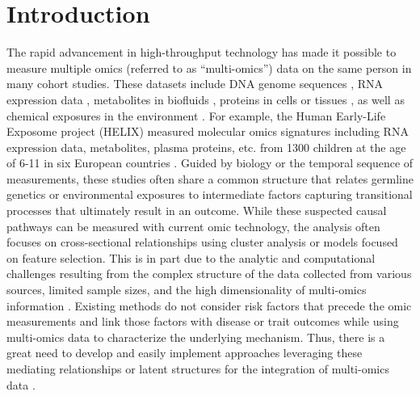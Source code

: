 \section{Introduction} \label{sec1}
The rapid advancement in high-throughput technology has made it possible to measure multiple omics (referred to as ``multi-omics'') data on the same person in many cohort studies. These datasets include DNA genome sequences \citep{goodwin2016coming}, RNA expression data \citep{ozsolak2011rna}, metabolites in biofluids \citep{beger2013review}, proteins in cells or tissues \citep{aslam2017proteomics}, as well as chemical exposures in the environment \citep{wild2005complementing}. For example, the Human Early-Life Exposome project (HELIX) measured molecular omics signatures including RNA expression data, metabolites, plasma proteins, etc. from 1300 children at the age of 6-11 in six European countries \citep{vrijheid2014human}. Guided by biology or the temporal sequence of measurements, these studies often share a common structure that relates germline genetics or environmental exposures to intermediate factors capturing transitional processes that ultimately result in an outcome. While these suspected causal pathways can be measured with current omic technology, the analysis often focuses on cross-sectional relationships using cluster analysis or models focused on feature selection. This is in part due to the analytic and computational challenges resulting from the complex structure of the data collected from various sources, limited sample sizes, and the high dimensionality of multi-omics information \citep{tini2019multi}. Existing methods do not consider risk factors that precede the omic measurements and link those factors with disease or trait outcomes while using multi-omics data to characterize the underlying mechanism. Thus, there is a great need to develop and easily implement approaches leveraging these mediating relationships or latent structures for the integration of multi-omics data \citep{subramanian2020multi}. 
